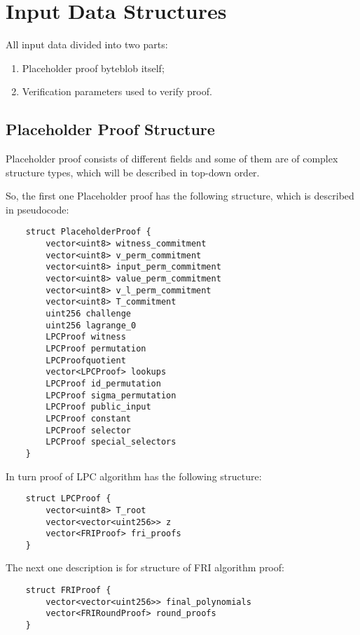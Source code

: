 \section{Input Data Structures}

All input data divided into two parts:

\begin{enumerate}
    \item Placeholder proof byteblob itself;
    \item Verification parameters used to verify proof.
\end{enumerate}

\subsection{Placeholder Proof Structure}

Placeholder proof consists of different fields and some of them are of complex structure types, which will be described in top-down order.

So, the first one Placeholder proof has the following structure, which is described in pseudocode:

\begin{verbatim}
    struct PlaceholderProof {
        vector<uint8> witness_commitment
        vector<uint8> v_perm_commitment
        vector<uint8> input_perm_commitment
        vector<uint8> value_perm_commitment
        vector<uint8> v_l_perm_commitment
        vector<uint8> T_commitment
        uint256 challenge
        uint256 lagrange_0
        LPCProof witness
        LPCProof permutation
        LPCProofquotient
        vector<LPCProof> lookups
        LPCProof id_permutation
        LPCProof sigma_permutation
        LPCProof public_input
        LPCProof constant
        LPCProof selector
        LPCProof special_selectors
    }
\end{verbatim}

In turn proof of LPC algorithm has the following structure:

\begin{verbatim}
    struct LPCProof {
        vector<uint8> T_root
        vector<vector<uint256>> z
        vector<FRIProof> fri_proofs
    }
\end{verbatim}

The next one description is for structure of FRI algorithm proof:

\begin{verbatim}
    struct FRIProof {
        vector<vector<uint256>> final_polynomials
        vector<FRIRoundProof> round_proofs
    }
\end{verbatim}

